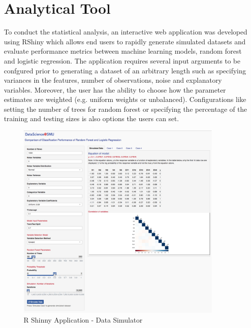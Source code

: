 \documentclass{llncs}
\begin{document}
\section{Analytical Tool}

To conduct the statistical analysis, an interactive web application was developed using RShiny which allows end users to rapidly generate simulated datasets and evaluate performance metrics between machine learning models, random forest and logistic regression. The application requires several input arguments to be confgured prior to generating a dataset of an arbitrary length such as specifying variances in the features, number of observations, noise and explanatory variables. Moreover, the user has the ability to choose how the parameter estimates are weighted (e.g. uniform weights or unbalanced). Configurations like setting the number of trees for random forest or specifying the percentage of the training and testing sizes is also options the users can set.

\begin{figure}
\centering
\includegraphics[width=0.9\textwidth]{full-tool.png}
\caption{R Shinny Application - Data Simulator}
\label{fig:rshiny}
\end{figure}
\end{document}

